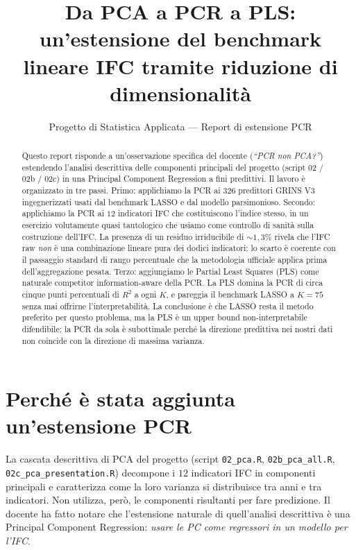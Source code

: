 \documentclass[11pt,a4paper]{article}
\title{Da PCA a PCR a PLS:\\
  un'estensione del benchmark lineare IFC tramite riduzione di dimensionalità}
\author{Progetto di Statistica Applicata --- Report di estensione PCR}
\date{}
\begin{document}
\maketitle

\begin{abstract}
\noindent
Questo report risponde a un'osservazione specifica del docente
(\emph{``PCR non PCA?''}) estendendo l'analisi descrittiva delle
componenti principali del progetto (script 02 / 02b / 02c) in una
Principal Component Regression a fini predittivi. Il lavoro è
organizzato in tre passi. Primo: applichiamo la PCR ai
\(326\) predittori GRINS V3 ingegnerizzati usati dal benchmark
LASSO e dal modello parsimonioso. Secondo: applichiamo la PCR ai
\(12\) indicatori IFC che costituiscono l'indice stesso, in un
esercizio volutamente quasi tautologico che usiamo come controllo
di sanità sulla costruzione dell'IFC. La presenza di un residuo
irriducibile di \(\sim 1{,}3\%\) rivela che l'IFC raw \emph{non} è
una combinazione lineare pura dei dodici indicatori; lo scarto è
coerente con il passaggio standard di rango percentuale che la
metodologia ufficiale applica prima dell'aggregazione pesata.
Terzo: aggiungiamo le Partial Least Squares (PLS) come naturale
competitor information-aware della PCR. La PLS domina la PCR di
circa cinque punti percentuali di \(R^{2}\) a ogni \(K\), e pareggia
il benchmark LASSO a \(K = 75\) senza mai offrirne
l'interpretabilità. La conclusione è che LASSO resta il metodo
preferito per questo problema, ma la PLS è un upper bound
non-interpretabile difendibile; la PCR da sola è subottimale perché
la direzione predittiva nei nostri dati non coincide con la
direzione di massima varianza.
\end{abstract}

\section{Perché è stata aggiunta un'estensione PCR}

La cascata descrittiva di PCA del progetto (script
\texttt{02\_pca.R}, \texttt{02b\_pca\_all.R},
\texttt{02c\_pca\_presentation.R}) decompone i \(12\) indicatori
IFC in componenti principali e caratterizza come la loro varianza
si distribuisce tra anni e tra indicatori. Non utilizza, però, le
componenti risultanti per fare predizione. Il docente ha fatto
notare che l'estensione naturale di quell'analisi descrittiva è
una Principal Component Regression: \emph{usare le PC come
regressori in un modello per l'IFC}.
\end{document}
